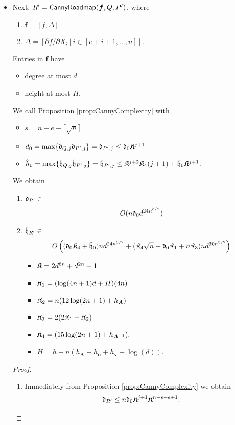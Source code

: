 \documentclass[12pt]{article}
\def\mA{{\bm A}}
\def\fd{\frak{d}}
\def\fh{\frak{h}}
\def\fK{\frak{K}}
\def\CannyRoadmapL{{\sf CannyRoadmap}}
\def\mA{{\bm A}}
\begin{document}
\begin{itemize}
\item Next, $R' = \CannyRoadmapL(\bm f, Q, P')$,  
where
\begin{enumerate}
    \item $\bm f = [f,\Delta]$
    \item $\Delta = [\partial f / \partial X_i~|~i \in [e+i+1,\hdots,n]]$.
\end{enumerate}

Entries in $\bm f$ have 
\begin{itemize}
    \item degree at most $d$
    \item height at most $H$.
\end{itemize}


%
We call Proposition \ref{prop:CannyComplexity} with
\begin{itemize}
    \item $s = n-e-\lceil\sqrt{n}\rceil $  
    \item $d_0 = \max\{\fd_{Q,j}\fd_{P',j}\}=\fd_{P',j}\leq \fd_0\fK^{j+1}$
    \item $\hat{h}_0 = \max\{\hat{\fh}_{Q,j}\hat{\fh}_{P',j}\}=\hat{\fh}_{P',j}\leq \fK^{j+2}\fK_4(j+1)+\hat{\fh}_0\fK^{j+1}$.
\end{itemize}
We obtain 
\begin{enumerate}
    \item $\fd_{R'} \in$
    \[
        O(n\frak{d}_0d^{24n^{3/2}}) 
    \]
    \item $\hat{\fh}_{R'}\in$
    \[
    O\left((\frak{d}_0\fK_4+\hat{\fh}_0)nd^{24n^{3/2}} + (\fK_4\sqrt{n}+\frak{d}_0\fK_1+n\fK_3)nd^{30n^{3/2}}\right)
    \]
    \begin{itemize}
    \item $\fK = 2d^{6n} + d^{2n} + 1$
    \item $\fK_1 = (\log(4n+1)d+H)(4n)$
    \item $\fK_2 = n(12\log(2n+1)+h_{\mA})$
    \item $\fK_3 = 2(2\fK_1+\fK_2)$
    \item $\fK_4 = (15\log(2n+1)+h_{\mA^{-1}}).$
    \item $H = h + n(h_{\bm A} + h_{\bm u} + h_{\bm v} + \log(d)).$
\end{itemize}
\end{enumerate}
\begin{proof}
\begin{enumerate}
    \item Immediately from Proposition \ref{prop:CannyComplexity} we obtain 
    \[
    \fd_{R'} \leq n\frak{d}_0\fK^{j+1}\fK^{n-s-e+1}.
\]
\end{enumerate}
\end{proof}
\end{itemize}
\end{document}

